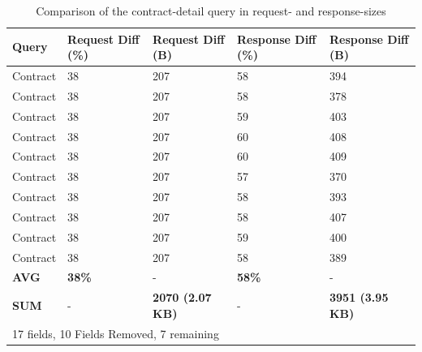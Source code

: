  \ifshowTables
 \begin{table}[H]
   \begin{tabular}{|l|l|l|l|l|}
   \hline
   Query  & Request Diff (\%)  & Request Diff (B) & Response Diff (\%) & Response Diff (B)  \\
   \hline
   Contract & 38\ & 207 & 58\ & 394 \\
   \hline
   Contract & 38\ & 207 & 58\ & 378 \\
   \hline
   Contract & 38\ & 207 & 59\ & 403 \\
   \hline
   Contract & 38\ & 207 & 60\ & 408 \\
   \hline
   Contract & 38\ & 207 & 60\ & 409 \\
   \hline
   Contract & 38\ & 207 & 57\ & 370 \\
   \hline
   Contract & 38\ & 207 & 58\ & 393 \\
   \hline
   Contract & 38\ & 207 & 58\ & 407 \\
   \hline
   Contract & 38\ & 207 & 59\ & 400 \\
   \hline
   Contract & 38\ & 207 & 58\ & 389 \\
   \hline
   \hline
   \textbf{AVG} & \textbf{38\%} & - & \textbf{58\%} & - \\
   \hline
   \textbf{SUM} & - & \textbf{2070 (2.07 KB)} & - & \textbf{3951 (3.95 KB)} \\
   \hline
   \multicolumn{5}{l}{17 fields, 10 Fields Removed, 7 remaining}
   \end{tabular}
   \caption{Comparison of the contract-detail query in request- and response-sizes}\label{table:code:comparison-contract-reduction}
 \end{table}
 \fi
